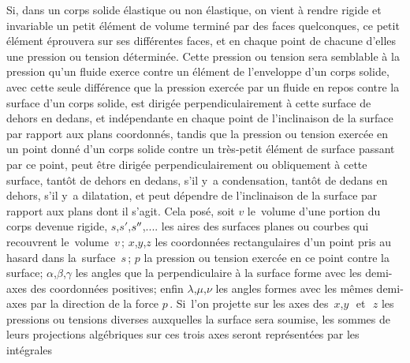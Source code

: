 \documentclass[11pt, twoside, leqno]{article}
\begin{document}
Si, dans un corps solide élastique ou non élastique, on vient à rendre rigide et invariable un petit élément de volume terminé par des faces quelconques, ce petit élément éprouvera sur ses différentes faces, et en chaque point de chacune d'elles une pression ou tension déterminée. Cette pression ou tension sera semblable à la pression qu'un fluide exerce contre un élément de l'enveloppe d'un corps solide, avec cette seule différence que la pression exercée par un fluide en repos contre la surface d'un corps solide, est dirigée perpendiculairement à cette surface de dehors en dedans, et indépendante en chaque point de l'inclinaison de la surface par rapport aux plans coordonnés, tandis que la pression ou tension exercée en un point donné d'un corps solide contre un très-petit élément de surface passant par ce point, peut être dirigée perpendiculairement ou obliquement à cette surface, tantôt de dehors en dedans, s'il y~a condensation, tantôt de dedans en dehors, s'il y~a dilatation, et peut dépendre de l'inclinaison de la surface par rapport aux plans dont il s'agit. Cela posé, soit
\;$v$\; le~volume d'une portion du corps devenue rigide,
\hbox{\;$s$,\:$s'$,\:$s'\kern-0.2ex'$,\:.\hspace{.1ex}.\hspace{.1ex}.\hspace{.1ex}.\;} les aires des surfaces planes ou courbes qui recouvrent le~volume~\;$v$\,;\hspace{.4ex}
\;$x$,\:$y$,\:$z$\; les coordonnées rectangulaires d'un point pris au hasard dans la~surface~\;$s$\,;\hspace{.4ex}
\;$p$\; la pression ou tension exercée en ce point contre la surface;\hspace{.2ex}
\hbox{\;$\alpha$,\:$\beta$,\:$\gamma$\;} les angles que la perpendiculaire à la surface forme avec les demi-axes des coordonnées positives;
enfin \hbox{\;$\lambda$,\:$\mu$,\:$\nu$\;} les angles formes avec les mêmes demi-axes par la direction de la force \;$p$\,.\hspace{.5ex}
Si~l'on projette sur les axes des~\hbox{\;$x$,\:$y$\, et \,$z$\;} les pressions ou tensions diverses auxquelles la surface sera soumise, les sommes de leurs projections algébriques sur ces trois axes seront représentées par les intégrales
\end{document}
